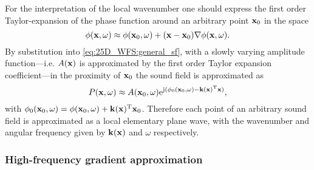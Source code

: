 For the interpretation of the local wavenumber one should express the first order Taylor-expansion of the phase function around an arbitrary point $\mathbf{x}_0$ in the space
\begin{equation}
\phi(\mathbf{x},\omega) \approx \phi(\mathbf{x}_0,\omega) + (\mathbf{x}-\mathbf{x}_0) \nabla \phi(\mathbf{x},\omega).
\end{equation}
By substitution into \eqref{eq:25D_WFS:general_sf}, with a slowly varying amplitude function---i.e. $A(\mathbf{x})$ is approximated by the first order Taylor expansion coefficient---in the proximity of $\mathbf{x}_0$ the sound field is approximated as
\begin{equation}
\label{Eq:25D_WFS:plane_wave_approximation}
P(\mathbf{x},\omega) \approx A(\mathbf{x}_0,\omega) \mathrm{e}^{\mathrm{j} ( \phi_0(\mathbf{x}_0,\omega) - \mathbf{k}(\mathbf{x})^{\mathrm{T}} \mathbf{x} )},
\end{equation}
with $\phi_0(\mathbf{x}_0,\omega) = \phi(\mathbf{x}_0,\omega) + \mathbf{k}(\mathbf{x})^{\mathrm{T}} \mathbf{x}_0 $.
Therefore each point of an arbitrary sound field is approximated as a local elementary plane wave, with the wavenumber and angular frequency given by $\mathbf{k}(\mathbf{x})$ and $\omega$ respectively.

\subsubsection{High-frequency gradient approximation}

